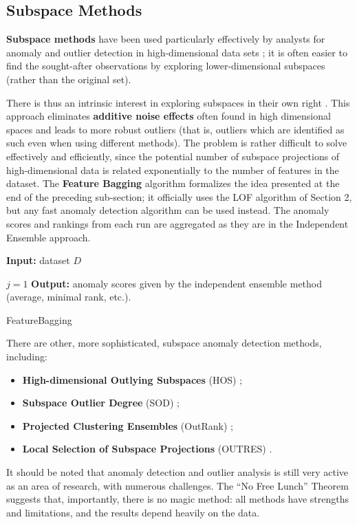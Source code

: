 %
\subsection{Subspace Methods}
%
%
\textbf{Subspace methods} have been used particularly effectively by analysts for anomaly and outlier detection in high-dimen\-sional data sets \cite{A8,A13,A14}; it is often easier to find the sought-after observations by exploring  lower-dimensional subspaces (rather than the original set). \par There is thus an intrinsic interest in exploring subspaces in their own right  \cite{A1,Aurore}. This approach eliminates \textbf{additive noise effects} often found in high dimensional spaces and leads to more robust outliers (that is, outliers which are identified as such even when using different methods). \newl The problem is rather difficult to solve effectively and efficiently, since the potential number of subspace projections of high-dimensional data is related exponentially to the number of features in the dataset. \newl The \textbf{Feature Bagging} algorithm formalizes the idea presented at the end of the preceding sub-section; it officially uses the LOF algorithm of Section 2, but any fast anomaly detection algorithm can be used instead. The anomaly scores and rankings from each run are aggregated as they are in the Independent Ensemble approach. 

\begin{algorithm}
\SetAlgoLined
\textbf{Input:} dataset $D$

$j=1$\;
\textbf{Output:} anomaly scores given by the independent ensemble method (average, minimal rank, etc.).
\caption{FeatureBagging}
\end{algorithm}
\noindent There are other, more sophisticated, subspace anomaly detection methods, including:
\begin{itemize}[noitemsep]
\item \textbf{High-dimensional Outlying Subspaces} (HOS) \cite{Zhang}; \item \textbf{Subspace Outlier Degree} (SOD) \cite{Zi};%
\item \textbf{Projected Clustering Ensembles} (OutRank) \cite{M1}; 
\item \textbf{Local Selection of Subspace Projections} (OUTRES) \cite{M3}.
\end{itemize}
It should be noted that anomaly detection and outlier analysis is still very active as an area of research, with numerous challenges. The ``No Free Lunch'' Theorem suggests that, importantly, there is no magic method: all methods have strengths and limitations, and the results depend heavily on the data. 
\afterpage{\FloatBarrier}